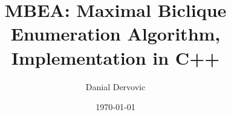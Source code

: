 \documentclass[11pt,a4paper]{article}
\begin{document}
\title{MBEA: Maximal Biclique Enumeration Algorithm, Implementation in C++}
\author{Danial Dervovic}
\date{\today}

\maketitle



\end{document}
